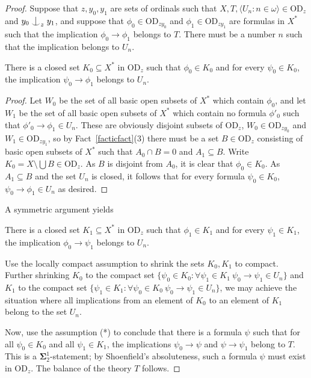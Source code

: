 \documentclass[10pt,a4paper]{amsart}
\newcommand{\forkindep}[1][]{%
  \mathrel{
    \mathop{
      \vcenter{
        \hbox{\oalign{\noalign{\kern-.3ex}\hfil$\vert$\hfil\cr
              \noalign{\kern-.7ex}
              $\smile$\cr\noalign{\kern-.3ex}}}
      }
    }\displaylimits_{#1}
  }
}
\newcommand{\gw}{\omega}
\newcommand{\vd}{\mathrm{OD}}
\begin{document}
\begin{proof}
Suppose that $z, y_0, y_1$ are sets of ordinals such that $X, T, \langle U_n\colon n\in\gw\rangle\in\vd_z$ and $y_0\forkindep_zy_1$, and suppose that $\phi_0\in\vd_{zy_0}$ and $\phi_1\in\vd_{zy_1}$ are formulas in $X^*$ such that the implication $\phi_0\to\phi_1$ belongs to $T$. There must be a number $n$ such that the implication belongs to $U_n$.





\begin{claim}
There is a closed set $K_0\subseteq X^*$ in $\vd_z$ such that $\phi_0\in K_0$ and for every $\psi_0\in K_0$, the implication $\psi_0\to\phi_1$ belongs to $U_n$.
\end{claim}

\begin{proof}
Let $W_0$ be the set of all basic open subsets of $X^*$ which contain $\phi_0$, and let $W_1$ be the set of all basic open subsets of $X^*$ which contain no formula $\phi'_0$ such that $\phi'_0\to\phi_1\in U_n$. These are obviously disjoint subsets of $\vd_z$, $W_0\in\vd_{zy_0}$ and $W_1\in\vd_{zy_1}$, so by Fact~\ref{facticfact}(3) there must be a set $B\in\vd_z$ consisting of basic open subsets of $X^*$ such that $A_0\cap B=0$ and $A_1\subseteq B$. Write $K_0=X\setminus \bigcup B\in\vd_z$. As $B$ is disjoint from $A_0$, it is clear that $\phi_0\in K_0$. As $A_1\subseteq B$ and the set $U_n$ is closed, it follows that for every formula $\psi_0\in K_0$, $\psi_0\to\phi_1\in U_n$ as desired.
\end{proof}

\noindent A symmetric argument yields

\begin{claim}
There is a closed set $K_1\subseteq X^*$ in $\vd_z$ such that $\phi_1\in K_1$ and for every $\psi_1\in K_1$, the implication $\phi_0\to\psi_1$ belongs to $U_n$.
\end{claim}


\noindent Use the locally compact assumption to shrink the sets $K_0, K_1$ to compact. Further shrinking $K_0$ to the compact set $\{\psi_0\in K_0\colon\forall \psi_1\in K_1\ \psi_0\to\psi_1\in U_n\}$  and $K_1$ to the compact set $\{\psi_1\in K_1\colon\forall \psi_0\in K_0\ \psi_0\to\psi_1\in U_n\}$, we may achieve the situation where all implications from an element of $K_0$ to an element of $K_1$ belong to the set $U_n$.

Now, use the assumption (*) to conclude that there is a formula $\psi$ such that for all $\psi_0\in K_0$ and all $\psi_1\in K_1$, the implications $\psi_0\to\psi$ and $\psi\to\psi_1$ belong to $T$. This is a ${\mathbf\Sigma}^1_2$-statement; by Shoenfield's absoluteness, such a formula $\psi$ must exist in $\vd_z$. The balance of the theory $T$ follows.
\end{proof}
\end{document}
